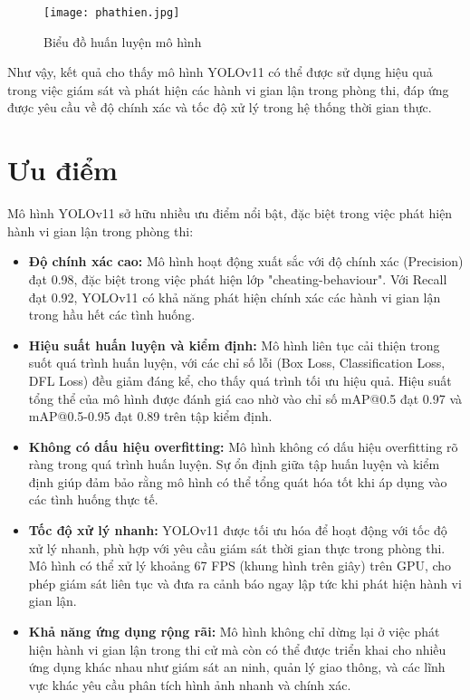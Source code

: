 \documentclass[conference]{IEEEtran}
\begin{document}
\begin{figure}[h]
    \centering
    \texttt{[image: phathien.jpg]}
    \caption{Biểu đồ huấn luyện mô hình}
    \label{fig:yolov11_architecture}
\end{figure}

Như vậy, kết quả cho thấy mô hình YOLOv11 có thể được sử dụng hiệu quả trong việc giám sát và phát hiện các hành vi gian lận trong phòng thi, đáp ứng được yêu cầu về độ chính xác và tốc độ xử lý trong hệ thống thời gian thực.
\section{Ưu điểm}

Mô hình YOLOv11 sở hữu nhiều ưu điểm nổi bật, đặc biệt trong việc phát hiện hành vi gian lận trong phòng thi:

\begin{itemize}
    \item \textbf{Độ chính xác cao:} Mô hình hoạt động xuất sắc với độ chính xác (Precision) đạt 0.98, đặc biệt trong việc phát hiện lớp "cheating-behaviour". Với Recall đạt 0.92, YOLOv11 có khả năng phát hiện chính xác các hành vi gian lận trong hầu hết các tình huống.
    
    \item \textbf{Hiệu suất huấn luyện và kiểm định:} Mô hình liên tục cải thiện trong suốt quá trình huấn luyện, với các chỉ số lỗi (Box Loss, Classification Loss, DFL Loss) đều giảm đáng kể, cho thấy quá trình tối ưu hiệu quả. Hiệu suất tổng thể của mô hình được đánh giá cao nhờ vào chỉ số mAP@0.5 đạt 0.97 và mAP@0.5-0.95 đạt 0.89 trên tập kiểm định.
    
    \item \textbf{Không có dấu hiệu overfitting:} Mô hình không có dấu hiệu overfitting rõ ràng trong quá trình huấn luyện. Sự ổn định giữa tập huấn luyện và kiểm định giúp đảm bảo rằng mô hình có thể tổng quát hóa tốt khi áp dụng vào các tình huống thực tế.
    
    \item \textbf{Tốc độ xử lý nhanh:} YOLOv11 được tối ưu hóa để hoạt động với tốc độ xử lý nhanh, phù hợp với yêu cầu giám sát thời gian thực trong phòng thi. Mô hình có thể xử lý khoảng 67 FPS (khung hình trên giây) trên GPU, cho phép giám sát liên tục và đưa ra cảnh báo ngay lập tức khi phát hiện hành vi gian lận.
    
    \item \textbf{Khả năng ứng dụng rộng rãi:} Mô hình không chỉ dừng lại ở việc phát hiện hành vi gian lận trong thi cử mà còn có thể được triển khai cho nhiều ứng dụng khác nhau như giám sát an ninh, quản lý giao thông, và các lĩnh vực khác yêu cầu phân tích hình ảnh nhanh và chính xác.
\end{itemize}
\end{document}
